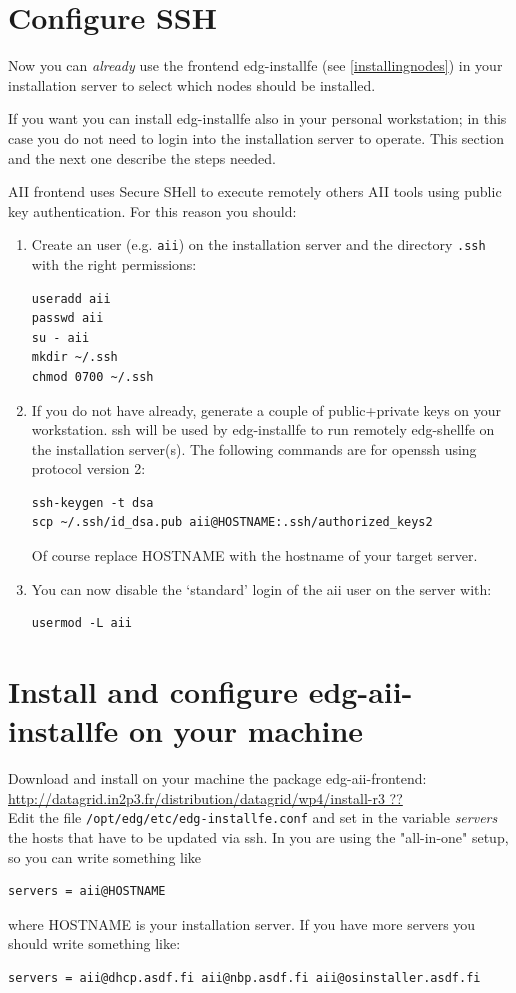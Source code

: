 \documentclass{datagridreport}
\begin{document}
\section{Configure SSH} \label{ssh}
Now you can \emph{already} use the frontend edg-installfe (see \ref{installingnodes}) in your
installation server to select which nodes should be installed.

If you want you can install edg-installfe also in your personal workstation; in this
case you do not need to login into the installation server to operate. This section and
the next one describe the steps needed.

AII frontend uses Secure SHell to execute remotely others AII tools using public
key authentication. For this reason you should:
\begin{enumerate}
\item Create an user (e.g. \texttt{aii}) on the installation server and the directory
\texttt{.ssh} with the right permissions:
\begin{verbatim}
useradd aii
passwd aii
su - aii
mkdir ~/.ssh
chmod 0700 ~/.ssh
\end{verbatim}
\item If you do not have already, generate a couple of public+private keys on your
workstation. ssh will be used by edg-installfe to run remotely edg-shellfe on
the installation server(s). The following commands are for openssh using protocol version 2:
\begin{verbatim}
ssh-keygen -t dsa
scp ~/.ssh/id_dsa.pub aii@HOSTNAME:.ssh/authorized_keys2
\end{verbatim}
Of course replace HOSTNAME with the hostname of your target server.
\item You can now disable the `standard' login of the aii user on the server with:
\begin{verbatim}
usermod -L aii
\end{verbatim}
\end{enumerate}

\section{Install and configure edg-aii-installfe on your machine}\label{frontend}
Download and install on your machine the package edg-aii-frontend:\\
\url{http://datagrid.in2p3.fr/distribution/datagrid/wp4/install-r3 ??}\\
Edit the file \texttt{/opt/edg/etc/edg-installfe.conf} and set in the
variable \emph{servers} the hosts that have to be updated via ssh.
In you are using the "all-in-one" setup, so you can write something like
\begin{verbatim}
servers = aii@HOSTNAME
\end{verbatim}
where HOSTNAME is your installation server. If you have more servers
you should write something like:
\begin{verbatim}
servers = aii@dhcp.asdf.fi aii@nbp.asdf.fi aii@osinstaller.asdf.fi
\end{verbatim}
\end{document}
